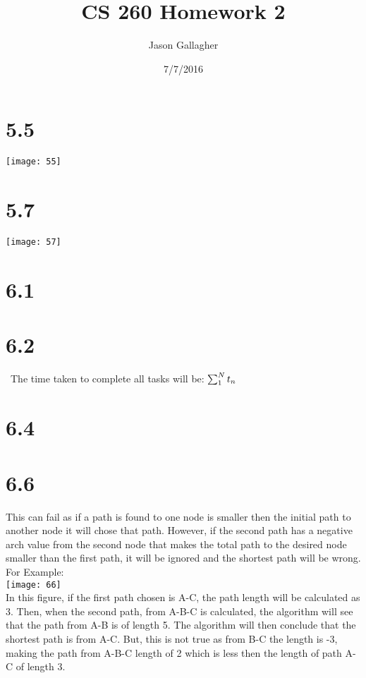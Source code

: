 \documentclass{article}
\begin{document}
		\title{CS 260 Homework 2}
		\date{7/7/2016}
		\author{Jason Gallagher}
		\maketitle



	\section{5.5}
	
	\texttt{[image: 55]}
	
	
		\section{5.7}
		
		\texttt{[image: 57]}
	
	
		
		\section{6.1}

	\section{6.2}
	\ The time taken to complete all tasks will be:
	\begin{math}
	\sum_{1}^{N}t_n	\\
	\end{math}
	
		\section{6.4}
	
	
	
		\section{6.6}
		This can fail as if a path is found to one node is smaller then the initial path to another node it will chose that path. However, if the second path has a negative arch value from the second node that makes the total path to the desired node smaller than the first path, it will be ignored and the shortest path will be wrong. For Example:\\
		\texttt{[image: 66]}
		\\
		In this figure, if the first path chosen is A-C, the path length will be calculated as 3. Then, when the second path, from A-B-C is calculated, the algorithm will see that the path from A-B is of length 5. The algorithm will then conclude that the shortest path is from A-C. But, this is not true as from B-C the length is -3, making the path from A-B-C length of 2 which is less then the length of path A-C of length 3.
\end{document}
